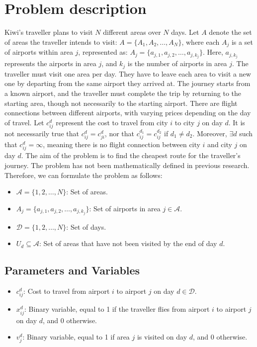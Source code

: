 \section{Problem description}

Kiwi's traveller plans to visit \(N\) different areas over \(N\) days. Let \(A\) denote the set of areas the traveller intends to visit:  
$A = \{A_1, A_2, \ldots, A_N\}$, where each \(A_j\) is a set of airports within area \(j\), represented as:  $A_j = \{a_{j,1}, a_{j,2}, \ldots, a_{j,k_j}\}$. Here, \(a_{j,k_j}\) represents the airports in area \(j\), and \(k_j\) is the number of airports in area \(j\). 
%
The traveller must visit one area per day. They have to leave each area to visit a new one by departing from the same airport they arrived at. The journey starts from a known airport, and the traveller must complete the trip by returning to the starting area, though not necessarily to the starting airport. 
%
There are flight connections between different airports, with varying prices depending on the day of travel. Let \(c^{d}_{ij}\) represent the cost to travel from city \(i\) to city \(j\) on day \(d\). It is not necessarily true that \(c^{d}_{ij} = c^{d}_{ji}\), nor that \(c^{d_1}_{ij} = c^{d_2}_{ij}\) if \(d_1 \neq d_2\). Moreover, \(\exists d\) such that \(c^{d}_{ij} = \infty\), meaning there is no flight connection between city \(i\) and city \(j\) on day \(d\). 
%
The aim of the problem is to find the cheapest route for the traveller's journey. 
%
The problem has not been mathematically defined in previous research. Therefore, we can formulate the problem as follows:

\begin{itemize}
    \item $\mathcal{A} = \{1, 2, \ldots, N\}$: Set of areas.
    \item $A_j = \{a_{j,1}, a_{j,2}, \ldots, a_{j,k_j}\}$: Set of airports in area $j \in \mathcal{A}$.
    \item $\mathcal{D} = \{1, 2, \ldots, N\}$: Set of days.
    \item $U_d \subseteq \mathcal{A}$: Set of areas that have not been visited by the end of day $d$.
\end{itemize}

\subsection*{Parameters and Variables}
\begin{itemize}
    \item $c_{ij}^d$: Cost to travel from airport $i$ to airport $j$ on day $d \in \mathcal{D}$.
    \item $x_{ij}^d$: Binary variable, equal to 1 if the traveller flies from airport $i$ to airport $j$ on day $d$, and 0 otherwise.
    \item $v_j^d$: Binary variable, equal to 1 if area $j$ is visited on day $d$, and 0 otherwise.
\end{itemize}

